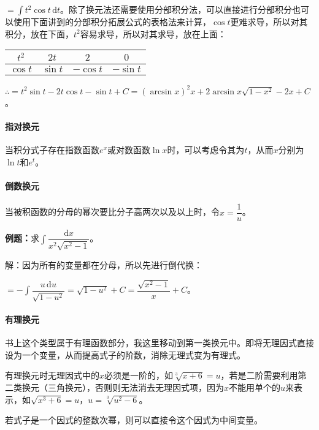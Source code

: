 \documentclass[UTF8, 12pt]{ctexart}
\begin{document}
$=\int t^2\cos t\,\textrm{d}t$。除了换元法还需要使用分部积分法，可以直接进行分部积分也可以使用下面讲到的分部积分拓展公式的表格法来计算，$\cos t$更难求导，所以对其积分，放在下面，$t^2$容易求导，所以对其求导，放在上面：\medskip

\begin{tabular}{|c|c|c|c|}
    \hline
    $t^2$ & $2t$ & $2$ & $0$ \\ \hline
    $\cos t$ & $\sin t$ & $-\cos t$ & $-\sin t$ \\
    \hline
\end{tabular} \medskip

$\therefore=t^2\sin t-2t\cos t-\sin t+C=(\arcsin x)^2x+2\arcsin x\sqrt{1-x^2}-2x+C$。

\paragraph{指对换元} \leavevmode \medskip

当积分式子存在指数函数$e^x$或对数函数$\ln x$时，可以考虑令其为$t$，从而$x$分别为$\ln t$和$e^t$。

\paragraph{倒数换元} \leavevmode \medskip

当被积函数的分母的幂次要比分子高两次以及以上时，令$x=\dfrac{1}{u}$。

\textbf{例题：}求$\displaystyle{\int\dfrac{\textrm{d}x}{x^2\sqrt{x^2-1}}}$。\medskip

解：因为所有的变量都在分母，所以先进行倒代换：

$=-\displaystyle{\int\dfrac{u\,\textrm{d}u}{\sqrt{1-u^2}}}=\sqrt{1-u^2}+C=\dfrac{\sqrt{x^2-1}}{x}+C$。

\paragraph{有理换元} \leavevmode \medskip

书上这个类型属于有理函数部分，我这里移动到第一类换元中。即将无理因式直接设为一个变量，从而提高式子的阶数，消除无理式变为有理式。

有理换元时无理因式中的$x$必须是一阶的，如$\sqrt[3]{x+6}=u$，若是二阶需要利用第二类换元（三角换元），否则则无法消去无理因式项，因为$x$不能用单个的$u$来表示，如$\sqrt{x^3+6}=u$，$u=\sqrt[3]{u^2-6}$。

若式子是一个因式的整数次幂，则可以直接令这个因式为中间变量。
\end{document}
